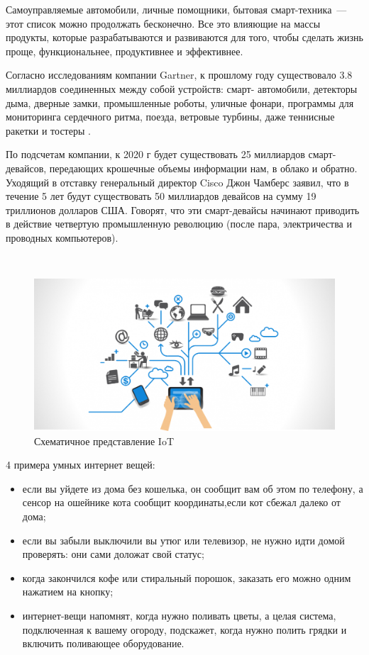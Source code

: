 Самоуправляемые автомобили, личные помощники, бытовая смарт-техника~--- этот список можно продолжать бесконечно. Все это влияющие на массы продукты, которые разрабатываются и развиваются для того, чтобы сделать жизнь проще, функциональнее, продуктивнее и эффективнее.

Согласно исследованиям компании Gartner, к прошлому году существовало 3.8 миллиардов соединенных между собой устройств: смарт- автомобили, детекторы дыма, дверные замки, промышленные роботы, уличные фонари, программы для мониторинга сердечного ритма, поезда, ветровые турбины, даже теннисные ракетки и тостеры .

По подсчетам компании, к 2020 г будет существовать 25 миллиардов смарт-девайсов, передающих крошечные объемы информации нам, в облако и обратно. Уходящий в отставку генеральный директор Cisco Джон Чамберс заявил, что в течение 5 лет будут существовать 50 миллиардов девайсов на сумму 19 триллионов долларов США. Говорят, что эти смарт-девайсы начинают приводить в действие четвертую промышленную революцию (после пара, электричества и проводных компьютеров).

~
\begin{figure}[H]
\centering
	\includegraphics[scale=0.4]{figures/iot_scheme.png}
	\caption{Схематичное представление IoT}
	\label{fig:subject:iot:scheme}
\end{figure}

4 примера умных интернет вещей:
\begin{itemize}
	\item если вы уйдете из дома без кошелька, он сообщит вам об этом по телефону, а сенсор на ошейнике кота сообщит координаты,если кот сбежал далеко от дома;
	\item если вы забыли выключили вы утюг или телевизор, не нужно идти домой проверять: они сами доложат свой статус;
	\item когда закончился кофе или стиральный порошок, заказать его можно одним нажатием на кнопку;
	\item интернет-вещи напомнят, когда нужно поливать цветы, а целая система, подключенная к вашему огороду, подскажет, когда нужно полить грядки и включить поливающее оборудование.
\end{itemize}

